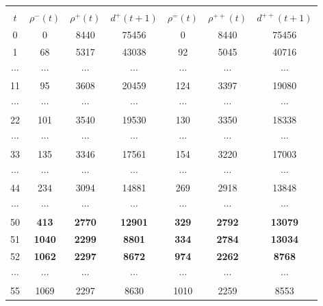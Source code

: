 \begin{multicols}{2}
\begin{table*}[b]
\begin{center}
\begin{tabular}{|c||c|c|c||c|c|c|} 
\hline
&&&&&&\\[-9pt]
$t$  & $\rho^{-}(t)$ & $\rho^{+}(t)$ & $d^{+}(t+1)$ &
$\rho^{=}(t)$ & $\rho^{++}(t)$&  $d^{++}(t+1)$ \\
 \hline
\hphantom{9}0  &\hphantom{99}0    & 8440  & 75456   &\hphantom{9}0      &8440   &75456\\
\hphantom{9}1  &\hphantom{9}68   & 5317  & 43038   &92     &5045   &40716 \\ 
$\cdots$ &$\cdots$    & $\cdots$     & $\cdots$   &$\cdots$      &$\cdots$      &$\cdots$      \\
11 &\hphantom{9}95   & 3608  & 20459   &124    &3397   &19080  \\
$\cdots$ &$\cdots$   & $\cdots$    & $\cdots$      &$\cdots$     &$\cdots$     &$\cdots$   \\
22 &\hphantom{9}101\hphantom{9}  & 3540  & 19530   &130    &3350   &18338 \\
$\cdots$ &$\cdots$  & $\cdots$   &$\cdots$      &$\cdots$     &$\cdots$   &$\cdots$    \\
33 &\hphantom{9}135\hphantom{9}  & 3346  & 17561   &154    &3220   &17003 \\
$\cdots$  &$\cdots$   & $\cdots$    & $\cdots$      &$\cdots$     &$\cdots$    &$\cdots$    \\
44 &\hphantom{9}234\hphantom{9}  & 3094  & 14881   &269    &2918   &13848 \\
$\cdots$ &$\cdots$   & $\cdots$    &$\cdots$      &$\cdots$     &$\cdots$     &$\cdots$    \\
50 &\hphantom{9}\bf 413\hphantom{9}  & \bf2770  & \bf12901   &\bf329    &\bf2792   &\bf13079 \\
51 &\hphantom{9}\bf1040\hphantom{99} & \bf2299  & \hphantom{9}\bf8801    &\bf334    &\bf2784   &\bf13034 \\
52 &\hphantom{9}\bf1062\hphantom{99} & \bf2297  & \hphantom{9}\bf8672    &\bf974    &\bf2262   &\hphantom{9}\bf8768  \\
$\cdots$ &$\cdots$   &$\cdots$    & $\cdots$      &$\cdots$      &$\cdots$     &$\cdots$    \\
55 &\hphantom{9}1069\hphantom{99} & 2297  & \hphantom{9}8630    &1010\hphantom{9}   &2259   &\hphantom{9}8553  \\
\hline
 \end{tabular}
\end{center}
 \end{table*}





\end{multicols}
